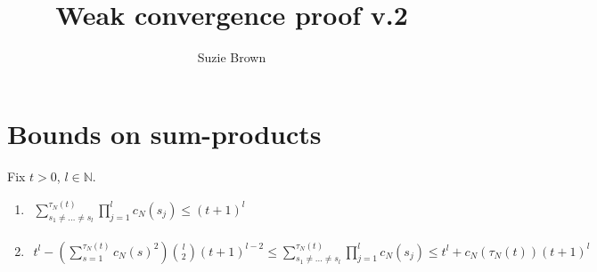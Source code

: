 \documentclass{article}
\title{Weak convergence proof v.2}
\author{Suzie Brown}
\newcommand{\1}[1]{\mathbbm{1}_{#1}}
\begin{document}
\maketitle
\thispagestyle{fancy}

\section*{Bounds on sum-products}

\begin{lemma}\label{thm:sumprod1}
Fix $t>0$, $l\in\mathbb{N}$.
\begin{enumerate}[label=(\alph*)]
\item \label{thm:sumprod1_a} \hspace{1cm}
$\begin{aligned}
\sum_{s_1\neq\dots\neq s_l}^{\tau_N(t)} \prod_{j=1}^l c_N(s_j)
\leq (t+1)^l
\end{aligned}$
\item \label{thm:sumprod1_b} \hspace{1cm}
$\begin{aligned}
t^l - \left( \sum_{s=1}^{\tau_N(t)} c_N(s)^2 \right) \binom{l}{2} (t+1)^{l-2} 
\leq \sum_{s_1\neq\dots\neq s_l}^{\tau_N(t)} \prod_{j=1}^l c_N(s_j)
\leq t^l + c_N(\tau_N(t)) (t+1)^l
\end{aligned}$
\end{enumerate}
\end{lemma}
\end{document}
